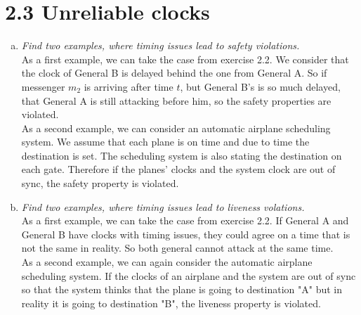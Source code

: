 \documentclass{article}
\begin{document}
	\section*{2.3 Unreliable clocks}
	\begin{adjustwidth}{2em}{2em}
		\begin{enumerate}[(a)]
			\item \textit{Find two examples, where timing issues lead to safety violations.} \\
			As a first example, we can take the case from exercise 2.2. We consider that the clock of General B is delayed behind the one from General A. So if messenger $m_2$ is arriving after time $t$, but General B's is so much delayed, that General A is still attacking before him, so the safety properties are violated. \\
			As a second example, we can consider an automatic airplane scheduling system. We assume that each plane is on time and due to time the destination is set. The scheduling system is also stating the destination on each gate. Therefore if the planes' clocks and the system clock are out of sync, the safety property is violated.
			\item \textit{Find two examples, where timing issues lead to liveness volations.} \\
			As a first example, we can take the case from exercise 2.2. If General A and General B have clocks with timing issues, they could agree on a time that is not the same in reality. So both general cannot attack at the same time. \\
			As a second example, we can again consider the automatic airplane scheduling system. If the clocks of an airplane and the system are out of sync so that the system thinks that the plane is going to destination "A" but in reality it is going to destination "B", the liveness property is violated.
		\end{enumerate}			
	\end{adjustwidth}
\end{document}
